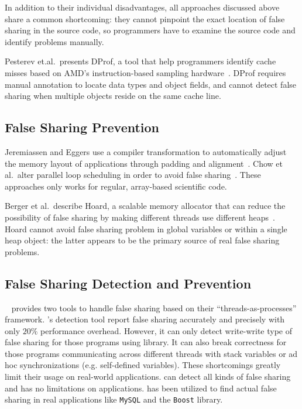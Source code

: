 In addition to their individual disadvantages,
all approaches discussed above share a common shortcoming:  
they cannot pinpoint the exact location of false sharing in the source code, so programmers have to examine the source code and identify problems manually.

Pesterev et.al.\ presents DProf, a tool that help programmers identify cache misses based on AMD's instruction-based sampling hardware~\cite{DProf}. DProf requires manual annotation to locate data types and object fields, and cannot detect false sharing when multiple objects reside on the same cache line.

\subsection{False Sharing Prevention}
Jeremiassen and Eggers use a compiler transformation to automatically adjust the memory layout of applications through padding and alignment~\cite{falseshare:compile}. Chow et al.\ alter parallel loop scheduling in order to avoid false
sharing~\cite{falseshare:schedule}. These approaches only works for regular, array-based scientific code.

Berger et al.\ describe Hoard, a scalable memory allocator that can reduce the possibility of false sharing by making different threads use different heaps~\cite{Hoard}. Hoard cannot avoid false sharing problem in global variables or within
a single heap object: the latter appears to be the primary source of real false sharing problems.

\subsection{False Sharing Detection and Prevention}
\sheriff{}~\cite{sheriff} provides two tools to handle false sharing based on their ``threads-as-processes'' framework.
\Sheriff{}'s detection tool report false sharing accurately and precisely with only $20\%$ performance overhead.
However, it can only detect write-write type of false sharing for those programs using \pthreads{} library. It can also break correctness for those programs communicating across different threads with stack variables or ad hoc synchronizations (e.g. self-defined variables). These shortcomings greatly limit their usage on real-world applications.  
\Predator{} can detect all kinds of false sharing and has no limitations on applications. \Predator{} has been utilized to find actual false sharing in real applications like \texttt{MySQL} and the \texttt{Boost} library.

